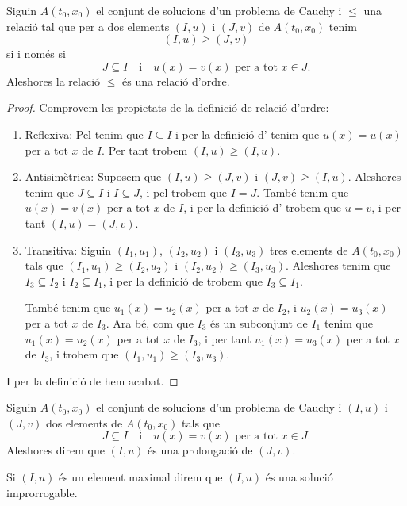\documentclass[../Apunts.tex]{subfiles}
\begin{document}
	\begin{proposition}
		\label{prop:la prolongació és una relació d'ordre}
		Siguin \(A(t_{0},x_{0})\) el conjunt de solucions d'un problema de Cauchy i \(\leq\) una relació tal que per a dos elements \((I,u)\) i \((J,v)\) de \(A(t_{0},x_{0})\) tenim
		\[(I,u)\geq(J,v)\]
		si i només si
		\[J\subseteq I\quad\text{i}\quad u(x)=v(x)\text{ per a tot }x\in J.\]
		Aleshores la relació \(\leq\) és una relació d'ordre.
		\begin{proof}
			Comprovem les propietats de la definició de relació d'ordre:
			\begin{enumerate}
				\item Reflexiva: Pel  tenim que \(I\subseteq I\) i per la definició d' tenim que \(u(x)=u(x)\) per a tot \(x\) de \(I\). Per tant trobem \((I,u)\geq(I,u)\).
				
				\item Antisimètrica: Suposem que \((I,u)\geq(J,v)\) i \((J,v)\geq(I,u)\). Aleshores tenim que \(J\subseteq I\) i \(I\subseteq J\), i pel  trobem que \(I=J\). També tenim que \(u(x)=v(x)\) per a tot \(x\) de \(I\), i per la definició d' trobem que \(u=v\), i per tant \((I,u)=(J,v)\).
				
				\item Transitiva: Siguin \((I_{1},u_{1})\), \((I_{2},u_{2})\) i \((I_{3},u_{3})\) tres elements de \(A(t_{0},x_{0})\) tals que \((I_{1},u_{1})\geq(I_{2},u_{2})\) i \((I_{2},u_{2})\geq(I_{3},u_{3})\). Aleshores tenim que \(I_{3}\subseteq I_{2}\) i \(I_{2}\subseteq I_{1}\), i per la definició de  trobem que \(I_{3}\subseteq I_{1}\).
				
				També tenim que \(u_{1}(x)=u_{2}(x)\) per a tot \(x\) de \(I_{2}\), i \(u_{2}(x)=u_{3}(x)\) per a tot \(x\) de \(I_{3}\). Ara bé, com que \(I_{3}\) és un subconjunt de \(I_{1}\) tenim que \(u_{1}(x)=u_{2}(x)\) per a tot \(x\) de \(I_{3}\), i per tant \(u_{1}(x)=u_{3}(x)\) per a tot \(x\) de \(I_{3}\), i trobem que \((I_{1},u_{1})\geq(I_{3},u_{3})\).
			\end{enumerate}
			I per la definició de  hem acabat.
		\end{proof}
	\end{proposition}
	\begin{definition}[Prolongació]
		\label{def:prolongació}
		\label{def:solució improrrogable}
		Siguin \(A(t_{0},x_{0})\) el conjunt de solucions d'un problema de Cauchy i \((I,u)\) i \((J,v)\) dos elements de \(A(t_{0},x_{0})\) tals que
		\[J\subseteq I\quad\text{i}\quad u(x)=v(x)\text{ per a tot }x\in J.\]
		Aleshores direm que \((I,u)\) és una prolongació de \((J,v)\).
		
		Si \((I,u)\) és un element maximal direm que \((I,u)\) és una solució improrrogable.
	\end{definition}
\end{document}
